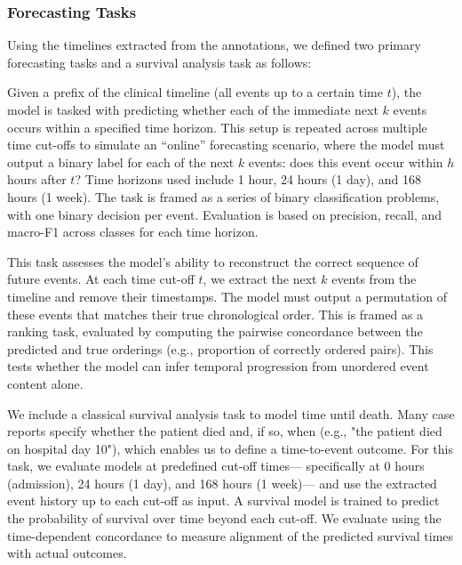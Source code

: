 \subsubsection{Forecasting Tasks}
Using the timelines extracted from the annotations, we defined two primary forecasting tasks and a survival analysis task as follows:

Given a prefix of the clinical timeline (all events up to a certain time $t$), the model is tasked with predicting whether each of the immediate next $k$ events occurs within a specified time horizon. 
This setup is repeated across multiple time cut-offs to simulate an “online” forecasting scenario, where the model must output a binary label for each of the next $k$ events:
does this event occur within $h$ hours after $t$? 
Time horizons used include 1 hour, 24 hours (1 day), and 168 hours (1 week). 
The task is framed as a series of binary classification problems, with one binary decision per event. 
Evaluation is based on precision, recall, and macro-F1 across classes for each time horizon.

This task assesses the model's ability to reconstruct the correct sequence of future events. 
At each time cut-off $t$, we extract the next $k$ events from the timeline and remove their timestamps. 
The model must output a permutation of these events that matches their true chronological order.
This is framed as a ranking task, evaluated by computing the pairwise concordance between the predicted and true orderings (e.g., proportion of correctly ordered pairs). 
This tests whether the model can infer temporal progression from unordered event content alone.

We include a classical survival analysis task to model time until death. 
Many case reports specify whether the patient died and, if so, when (e.g., "the patient died on hospital day 10"), which enables us to define a time-to-event outcome. 
For this task, we evaluate models at predefined cut-off times--- specifically at 0 hours (admission), 24 hours (1 day), and 168 hours (1 week)--- and use the extracted event history up to each cut-off as input. 
A survival model is trained to predict the probability of survival over time beyond each cut-off. 
We evaluate using the time-dependent concordance to measure alignment of the predicted survival times with actual outcomes.

